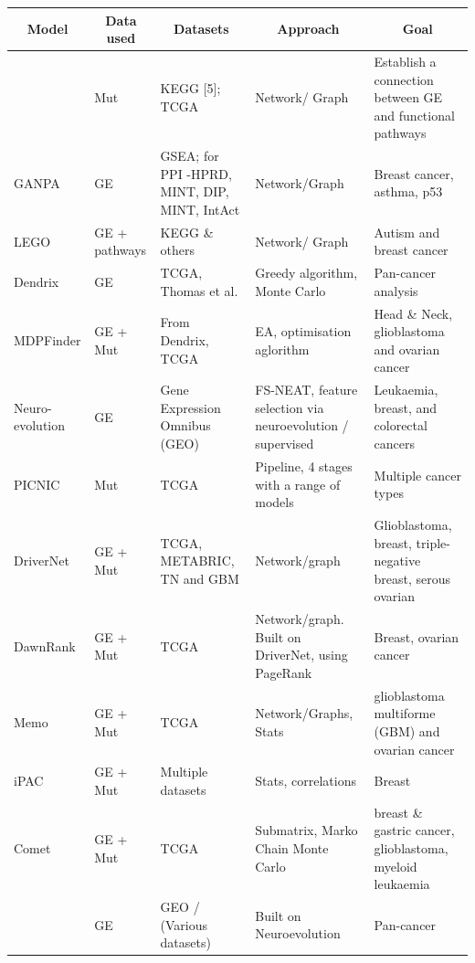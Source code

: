 \begin{appendices}
    \newpage
    \begin{small}
      \begin{longtable}[!h]{|p{2.0cm}|p{2.5cm}|p{3.5cm}|p{3.0cm}|p{5.5cm}|} 
        \hline \multicolumn{1}{|c|}{\textbf{Model}} 
        & \multicolumn{1}{c|}{\textbf{Data used}} 
        & \multicolumn{1}{c|}{\textbf{Datasets}} 
        & \multicolumn{1}{c|}{\textbf{Approach}}
        & \multicolumn{1}{c|}{\textbf{Goal}}  \\ \hline  \hline
        \endfirsthead
        
        \endlastfoot    
          \citet{Cava2018-rv} & Mut & KEGG [5]; TCGA  & Network/ Graph & Establish a connection between GE and functional pathways  \\ \hline
          GANPA & GE  & GSEA; for PPI -HPRD, MINT, DIP, MINT, IntAct & Network/Graph & Breast cancer, asthma, p53 \\ \hline
          LEGO & GE + pathways & KEGG \& others & Network/ Graph & Autism and breast cancer \\ \hline
          Dendrix & GE & TCGA, Thomas et al. & Greedy algorithm, Monte Carlo & Pan-cancer analysis \\ \hline
          MDPFinder & GE + Mut & From Dendrix, TCGA & EA, optimisation aglorithm & Head \& Neck, glioblastoma and ovarian cancer \\ \hline
          Neuro-evolution & GE & Gene Expression Omnibus (GEO) & FS-NEAT, feature selection via neuroevolution / supervised & Leukaemia, breast, and colorectal cancers \\ \hline
          PICNIC  & Mut & TCGA  & Pipeline, 4 stages with a range of models & Multiple cancer types  \\ \hline
          DriverNet & GE + Mut & TCGA, METABRIC, TN and GBM & Network/graph &  Glioblastoma, breast, triple-negative breast, serous ovarian \\ \hline
          DawnRank & GE + Mut & TCGA & Network/graph. Built on DriverNet, using PageRank & Breast, ovarian cancer \\ \hline
          Memo & GE + Mut & TCGA & Network/Graphs, Stats & glioblastoma multiforme (GBM) and ovarian cancer \\ \hline
          iPAC & GE + Mut & Multiple datasets & Stats, correlations & Breast \\ \hline
          Comet  & GE + Mut & TCGA & Submatrix, Marko Chain Monte Carlo & breast \& gastric cancer, glioblastoma, myeloid leukaemia \\ \hline
          \citet{Feltes2019-bd} & GE  & GEO / (Various datasets) & Built on Neuroevolution & Pan-cancer \\ \hline

\end{longtable}
\end{small}
\end{appendices}

